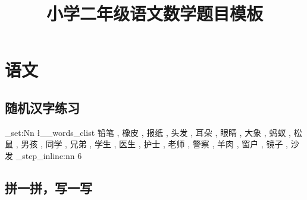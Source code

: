 \documentclass[scheme=chinese]{ctexart}
\title{小学二年级语文数学题目模板}
\begin{document}
\maketitle
\section{语文}
\subsection{随机汉字练习}

\ExplSyntaxOn
\clist_set:Nn \l__words_clist
{
{铅笔} , {橡皮} , {报纸} ,
{头发} , {耳朵} , {眼睛} ,
{大象} , {蚂蚁} , {松鼠} ,
{男孩} , {同学} , {兄弟} ,
{学生} , {医生} , {护士} ,
{老师} , {警察} , {羊肉} ,
{窗户} , {镜子} , {沙发}
}
\int_step_inline:nn {6}
{
\hspace{1cm}
}
\ExplSyntaxOff

\subsection{拼一拼，写一写}
\end{document}
